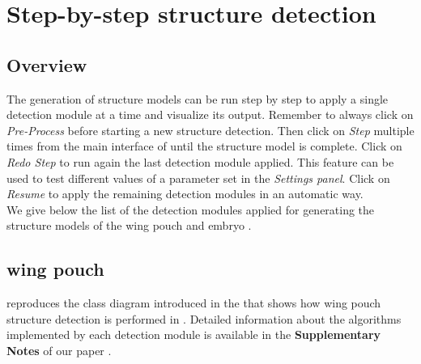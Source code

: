 \section{Step-by-step structure detection} \label{sec:supervised_structure}
\subsection{Overview}
The generation of structure models can be run step by step to apply a single detection module at a time and visualize its output. Remember to always click on \emph{Pre-Process} before starting a new structure detection. Then click on \textit{Step} multiple times from the main interface of \wingj until the structure model is complete. Click on \textit{Redo Step} to run again the last detection module applied. This feature can be used to test different values of a parameter set in the \emph{Settings panel}. Click on \textit{Resume} to apply the remaining detection modules in an automatic way.\\
% 

We give below the list of the detection modules applied for generating the structure models of the \droso wing pouch and embryo \autocite{schaffter2013}.

\subsection{\droso wing pouch}\label{sec:wpouch_class_diagram}
 reproduces the class diagram introduced in the \wingjDeveloperGuide that shows how wing pouch structure detection is performed in \wingj. Detailed information about the algorithms implemented by each detection module is available in the \textbf{Supplementary Notes} of our paper \autocite{schaffter2013}.

